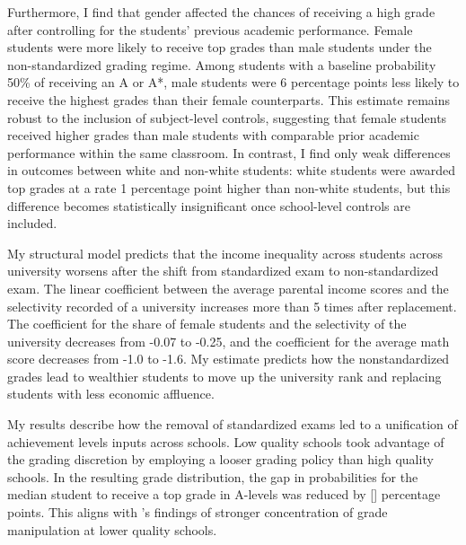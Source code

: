 Furthermore, I find that gender affected the chances of receiving a high grade after controlling for the students' previous academic performance. Female students were more likely to receive top grades than male students under the non-standardized grading regime. Among students with a baseline probability 50\% of receiving an A or A*, male students were 6 percentage points less likely to receive the highest grades than their female counterparts. This estimate remains robust to the inclusion of subject-level controls, suggesting that female students received higher grades than male students with comparable prior academic performance within the same classroom. In contrast, I find only weak differences in outcomes between white and non-white students: white students were awarded top grades at a rate 1 percentage point higher than non-white students, but this difference becomes statistically insignificant once school-level controls are included.

My structural model predicts that the income inequality across students across university worsens after the shift from standardized exam to non-standardized exam. The linear coefficient between the average parental income scores and the selectivity recorded of a university increases more than 5 times after replacement. The coefficient for the share of female students and the selectivity of the university decreases from -0.07 to -0.25, and the coefficient for the average math score decreases from -1.0 to -1.6. My estimate predicts how the nonstandardized grades lead to wealthier students to move up the university rank and replacing students with less economic affluence. 

\vspace{0.5em}

My results describe how the removal of standardized exams led to a unification of achievement levels inputs across schools. Low quality schools took advantage of the grading discretion by employing a looser grading policy than high quality schools. In the resulting grade distribution, the gap in probabilities for the median student to receive a top grade in A-levels was reduced by [] percentage points. This aligns with \cite{figlio2004}'s findings of stronger concentration of grade manipulation at lower quality schools. 


